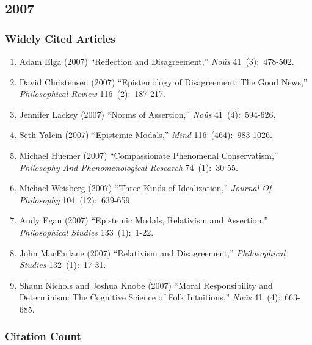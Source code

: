 \documentclass[
  10pt,
  letterpaper,
  DIV=11,
  numbers=noendperiod,
  twoside]{scrartcl}
\providecommand{\tightlist}{%
  \setlength{\itemsep}{0pt}\setlength{\parskip}{0pt}}\usepackage{longtable,booktabs,array}
\begin{document}
\newpage

\subsection{2007}\label{sec-s2007}

\subsubsection*{Widely Cited Articles}\label{widely-cited-articles-50}

\begin{enumerate}
\def\labelenumi{\arabic{enumi}.}
\tightlist
\item
  Adam Elga (2007) ``Reflection and Disagreement,'' \emph{Noûs}
  41~(3):~478-502.
\item
  David Christensen (2007) ``Epistemology of Disagreement: The Good
  News,'' \emph{Philosophical Review} 116~(2):~187-217.
\item
  Jennifer Lackey (2007) ``Norms of Assertion,'' \emph{Noûs}
  41~(4):~594-626.
\item
  Seth Yalcin (2007) ``Epistemic Modals,'' \emph{Mind}
  116~(464):~983-1026.
\item
  Michael Huemer (2007) ``Compassionate Phenomenal Conservatism,''
  \emph{Philosophy And Phenomenological Research} 74~(1):~30-55.
\item
  Michael Weisberg (2007) ``Three Kinds of Idealization,'' \emph{Journal
  Of Philosophy} 104~(12):~639-659.
\item
  Andy Egan (2007) ``Epistemic Modals, Relativism and Assertion,''
  \emph{Philosophical Studies} 133~(1):~1-22.
\item
  John MacFarlane (2007) ``Relativism and Disagreement,''
  \emph{Philosophical Studies} 132~(1):~17-31.
\item
  Shaun Nichols and Joshua Knobe (2007) ``Moral Responsibility and
  Determinism: The Cognitive Science of Folk Intuitions,'' \emph{Noûs}
  41~(4):~663-685.
\end{enumerate}

\subsubsection*{Citation Count}\label{sec-count-2007}
\end{document}

